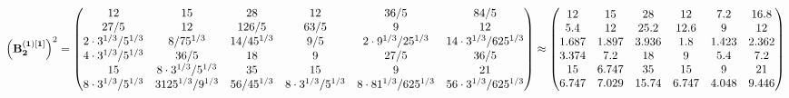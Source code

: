 \documentclass[10pt,a4paper]{article}
\begin{document}
	\[
		\left(\bold{B_2^{(1)[1]}}\right)^{2} = 
		\begin{pmatrix}
			{{12}}{} & {{15}}{} & {{28}}{} & {{12}}{} & {{36}} / {{5}} & {{84}} / {{5}} \\
			{{27}} / {{5}} & {{12}}{} & {{126}} / {{5}} & {{63}} / {{5}} & {{9}}{} & {{12}}{} \\
			{{2} \cdot {3^ {1 / 3}}} / {{5^ {1 / 3}}} & {{8}} / {{75^ {1 / 3}}} & {{14}} / {{45^ {1 / 3}}} & {{9}} / {{5}} & {{2} \cdot {9^ {1 / 3}}} / {{25^ {1 / 3}}} & {{14} \cdot {3^ {1 / 3}}} / {{625^ {1 / 3}}} \\
			{{4} \cdot {3^ {1 / 3}}} / {{5^ {1 / 3}}} & {{36}} / {{5}} & {{18}}{} & {{9}}{} & {{27}} / {{5}} & {{36}} / {{5}} \\
			{{15}}{} & {{8} \cdot {3^ {1 / 3}}} / {{5^ {1 / 3}}} & {{35}}{} & {{15}}{} & {{9}}{} & {{21}}{} \\
			{{8} \cdot {3^ {1 / 3}}} / {{5^ {1 / 3}}} & {{3125^ {1 / 3}}} / {{9^ {1 / 3}}} & {{56}} / {{45^ {1 / 3}}} & {{8} \cdot {3^ {1 / 3}}} / {{5^ {1 / 3}}} & {{8} \cdot {81^ {1 / 3}}} / {{625^ {1 / 3}}} & {{56} \cdot {3^ {1 / 3}}} / {{625^ {1 / 3}}} \\
		\end{pmatrix}
		\approx
		\begin{pmatrix}
			12       & 15       & 28       & 12       & 7.2      & 16.8     \\
			5.4      & 12       & 25.2     & 12.6     & 9        & 12       \\
			1.687    & 1.897    & 3.936    & 1.8      & 1.423    & 2.362    \\
			3.374    & 7.2      & 18       & 9        & 5.4      & 7.2      \\
			15       & 6.747    & 35       & 15       & 9        & 21       \\
			6.747    & 7.029    & 15.74    & 6.747    & 4.048    & 9.446    \\
		\end{pmatrix}
	\]
\end{document}
